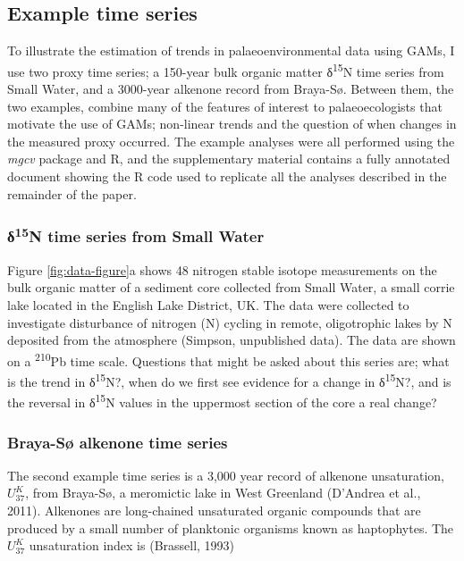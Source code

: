 \documentclass[12pt,]{article}
\newcommand{\uk}{\ensuremath{\mathit{U}^{\mathit{K}}_{\mathup{37}}}}
\begin{document}
\subsection{Example time series}\label{example-time-series}

To illustrate the estimation of trends in palaeoenvironmental data using
GAMs, I use two proxy time series; a 150-year bulk organic matter
δ\textsuperscript{15}N time series from Small Water, and a 3000-year
alkenone record from Braya-Sø. Between them, the two examples, combine
many of the features of interest to palaeoecologists that motivate the
use of GAMs; non-linear trends and the question of when changes in the
measured proxy occurred. The example analyses were all performed using
the \emph{mgcv} package and R, and the supplementary material contains a
fully annotated document showing the R code used to replicate all the
analyses described in the remainder of the paper.

\subsubsection{\texorpdfstring{δ\textsuperscript{15}N time series from
Small
Water}{δ15N time series from Small Water}}\label{15n-time-series-from-small-water}

Figure \ref{fig:data-figure}a shows 48 nitrogen stable isotope
measurements on the bulk organic matter of a sediment core collected
from Small Water, a small corrie lake located in the English Lake
District, UK. The data were collected to investigate disturbance of
nitrogen (N) cycling in remote, oligotrophic lakes by N deposited from
the atmosphere (Simpson, unpublished data). The data are shown on a
\textsuperscript{210}Pb time scale. Questions that might be asked about
this series are; what is the trend in δ\textsuperscript{15}N?, when do
we first see evidence for a change in δ\textsuperscript{15}N?, and is
the reversal in δ\textsuperscript{15}N values in the uppermost section
of the core a real change?

\subsubsection{Braya-Sø alkenone time
series}\label{braya-s-alkenone-time-series}

The second example time series is a 3,000 year record of alkenone
unsaturation, \uk, from Braya-Sø, a meromictic lake in West Greenland
(D'Andrea et al., 2011). Alkenones are long-chained unsaturated organic
compounds that are produced by a small number of planktonic organisms
known as haptophytes. The \uk{} unsaturation index is (Brassell, 1993)
\end{document}
